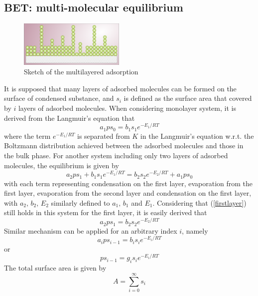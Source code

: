 \documentclass[%
 reprint,
 amsmath,amssymb,
 aps,
10.5pt,
]{revtex4-1}
\begin{document}
\subsection{BET: multi-molecular equilibrium}
\begin{figure}
\centering
\includegraphics[width=0.45\textwidth]{figures/900px-BET_Multilayer_Adsorption.svg.png}
\caption{Sketch of the multilayered adsorption}
\end{figure}
It is supposed that many layers of adsorbed molecules can be formed on the surface of condensed substance, and $s_i$ is defined as the surface area that covered by $i$ layers of adsorbed molecules. When considering monolayer system, it is derived from the Langmuir's equation that
\begin{equation}
a_1 p s_0 = b_1 s_1 e^{-E_1/RT}
\label{firstlayer}
\end{equation}
where the term $e^{-E_1/RT}$ is separated from $K$ in the Langmuir's equation w.r.t. the Boltzmann distribution achieved between the adsorbed molecules and those in the bulk phase. For another system including only two layers of adsorbed molecules, the equilibrium is given by
\begin{equation}
a_2 p s_1 + b_1 s_1 e^{-E_1/RT} = b_2 s_2 e^{-E_2/RT} + a_1 p s_0
\end{equation}
with each term representing condensation on the first layer, evaporation from the first layer, evaporation from the second layer and condensation on the first layer, with $a_2,\, b_2,\, E_2$ similarly defined to $a_1,\, b_1$ and $E_1$. Considering that (\ref{firstlayer}) still holds in this system for the first layer, it is easily derived that
\begin{equation}
a_2 p s_1 = b_2 s_2 e^{-E_2/RT}
\end{equation}
Similar mechanism can be applied for an arbitrary index $i$, namely
\begin{equation}
a_i p s_{i-1} = b_i s_i e^{-E_i/RT}
\end{equation}
or
\begin{equation}
p s_{i-1} = g_i s_i e^{-E_i/RT}
\end{equation}
The total surface area is given by
\begin{equation}
A=\sum_{i=0}^{\infty} s_i
\end{equation}
\end{document}
